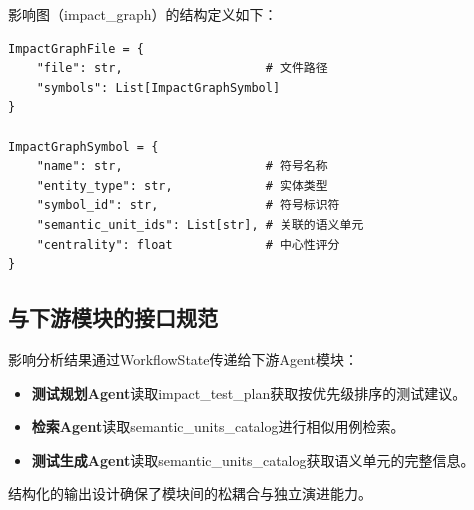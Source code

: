影响图（impact\_graph）的结构定义如下：

\begin{lstlisting}
ImpactGraphFile = {
    "file": str,                    # 文件路径
    "symbols": List[ImpactGraphSymbol]
}

ImpactGraphSymbol = {
    "name": str,                    # 符号名称
    "entity_type": str,             # 实体类型
    "symbol_id": str,               # 符号标识符
    "semantic_unit_ids": List[str], # 关联的语义单元
    "centrality": float             # 中心性评分
}
\end{lstlisting}

\subsection{与下游模块的接口规范}
影响分析结果通过WorkflowState传递给下游Agent模块：

\begin{itemize}
    \item \textbf{测试规划Agent}读取impact\_test\_plan获取按优先级排序的测试建议。
    \item \textbf{检索Agent}读取semantic\_units\_catalog进行相似用例检索。
    \item \textbf{测试生成Agent}读取semantic\_units\_catalog获取语义单元的完整信息。
\end{itemize}

结构化的输出设计确保了模块间的松耦合与独立演进能力。

